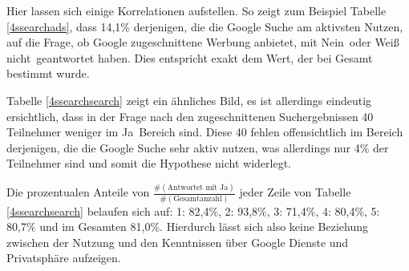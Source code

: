Hier lassen sich einige Korrelationen aufstellen. So zeigt zum Beispiel Tabelle \ref{4ssearchads}, dass 14,1\% derjenigen, die die Google Suche am aktivsten Nutzen, auf die Frage, ob Google zugeschnittene Werbung anbietet, mit \glqq Nein\grqq\ oder \grqq Weiß nicht\glqq\ geantwortet haben. Dies entspricht exakt dem Wert, der bei Gesamt bestimmt wurde.

Tabelle \ref{4ssearchsearch} zeigt ein ähnliches Bild, es ist allerdings eindeutig ersichtlich, dass in der Frage nach den zugeschnittenen Suchergebnissen 40 Teilnehmer weniger im \grqq Ja\glqq\ Bereich sind. Diese 40 fehlen offensichtlich im Bereich derjenigen, die die Google Suche sehr aktiv nutzen, was allerdings nur 4\% der Teilnehmer sind und somit die Hypothese nicht widerlegt.

Die prozentualen Anteile von $\frac{\#(\text{Antwortet mit Ja})}{\#(\text{Gesamtanzahl})}$ jeder Zeile von Tabelle \ref{4ssearchsearch} belaufen sich auf: 1: 82,4\%, 2: 93,8\%, 3: 71,4\%, 4: 80,4\%, 5: 80,7\% und im Gesamten 81,0\%. Hierdurch lässt sich also keine Beziehung zwischen der Nutzung und den Kenntnissen über Google Dienste und Privatsphäre aufzeigen.

